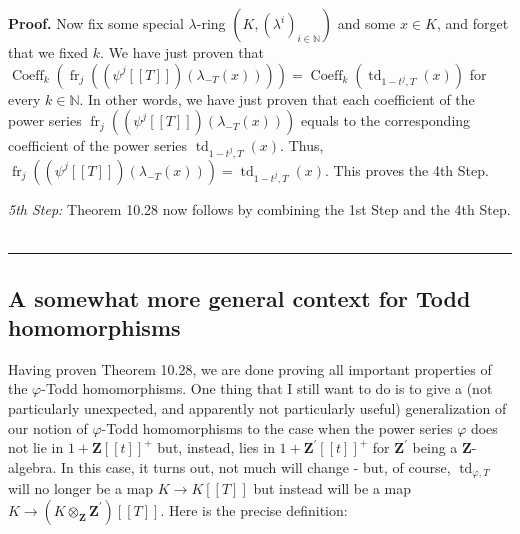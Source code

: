 \documentclass[numbers=enddot,12pt,final,onecolumn,notitlepage]{scrartcl}%
\newenvironment{proof}[1][Proof]{\noindent\textbf{#1.} }{\ \rule{0.5em}{0.5em}}
\begin{document}
\begin{proof}
Now fix some special $\lambda$-ring $\left(  K,\left(  \lambda^{i}\right)
_{i\in\mathbb{N}}\right)  $ and some $x\in K$, and forget that we fixed $k$.
We have just proven that $\operatorname*{Coeff}\nolimits_{k}\left(
\operatorname*{fr}\nolimits_{j}\left(  \left(  \psi^{j}\left[  \left[
T\right]  \right]  \right)  \left(  \lambda_{-T}\left(  x\right)  \right)
\right)  \right)  =\operatorname*{Coeff}\nolimits_{k}\left(
\operatorname*{td}\nolimits_{1-t^{j},T}\left(  x\right)  \right)  $ for every
$k\in\mathbb{N}$. In other words, we have just proven that each coefficient of
the power series $\operatorname*{fr}\nolimits_{j}\left(  \left(  \psi
^{j}\left[  \left[  T\right]  \right]  \right)  \left(  \lambda_{-T}\left(
x\right)  \right)  \right)  $ equals to the corresponding coefficient of the
power series $\operatorname*{td}\nolimits_{1-t^{j},T}\left(  x\right)  $.
Thus, $\operatorname*{fr}\nolimits_{j}\left(  \left(  \psi^{j}\left[  \left[
T\right]  \right]  \right)  \left(  \lambda_{-T}\left(  x\right)  \right)
\right)  =\operatorname*{td}\nolimits_{1-t^{j},T}\left(  x\right)  $. This
proves the 4th Step.

\textit{5th Step:} Theorem 10.28 now follows by combining the 1st Step and the
4th Step.
\end{proof}

\subsection{A somewhat more general context for Todd homomorphisms}

Having proven Theorem 10.28, we are done proving all important properties of
the $\varphi$-Todd homomorphisms. One thing that I still want to do is to give
a (not particularly unexpected, and apparently not particularly useful)
generalization of our notion of $\varphi$-Todd homomorphisms to the case when
the power series $\varphi$ does not lie in $1+\mathbf{Z}\left[  \left[
t\right]  \right]  ^{+}$ but, instead, lies in $1+\mathbf{Z}^{\prime}\left[
\left[  t\right]  \right]  ^{+}$ for $\mathbf{Z}^{\prime}$ being a
$\mathbf{Z}$-algebra. In this case, it turns out, not much will change - but,
of course, $\operatorname*{td}\nolimits_{\varphi,T}$ will no longer be a map
$K\rightarrow K\left[  \left[  T\right]  \right]  $ but instead will be a map
$K\rightarrow\left(  K\otimes_{\mathbf{Z}}\mathbf{Z}^{\prime}\right)  \left[
\left[  T\right]  \right]  $. Here is the precise definition:
\end{document}
